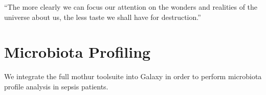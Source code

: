 \begin{savequote}[75mm]
“The more clearly we can focus our attention on the wonders and realities of the universe about us, the less taste we shall have for destruction.”
\end{savequote}

\chapter{Microbiota Profiling}
\label{chapter:microbiota}
\setcounter{figure}{-1}
\setcounter{table}{-1}
\setcounter{section}{-1}

We integrate the full mothur toolsuite into Galaxy in order to perform microbiota profile analysis in sepsis patients.
